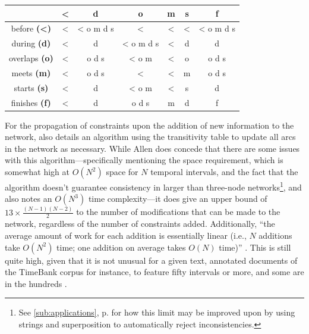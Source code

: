 \documentclass[a4paper,12pt,leqno,twoside]{article}
\makeatletter
\newcommand*\bigcdot{\mathpalette\bigcdot@{0.75}}
\newcommand*\bigcdot@[2]{\mathbin{\vcenter{\hbox{\scalebox{#2}{$\m@th#1\bullet$}}}}}
\makeatother
\begin{document}
\begin{center}
	\onehalfspacing
	\begin{tabular}{|c|c|c|c|c|c|c|}
		\hline
		\diagbox{$A \bigcdot B$}{$B \bigcdot' C$} & \textbf{\textless{}} & \textbf{d} & \textbf{o} & \textbf{m} & \textbf{s} & \textbf{f}\\
		\hline
		before \textbf{(\textless{})} & \textless{} & \textless{} o m d s & \textless{} & \textless{} & \textless{} & \textless{} o m d s\\
		\hline
		during \textbf{(d)} & \textless{} & d & \textless{} o m d s & \textless{} & d & d\\
		\hline
		overlaps \textbf{(o)} & \textless{} & o d s & \textless{} o m & \textless{} & o & o d s\\
		\hline
		meets \textbf{(m)} & \textless{} & o d s & \textless{} & \textless{} & m & o d s\\
		\hline
		starts \textbf{(s)} & \textless{} & d & \textless{} o m & \textless{} & s & d\\
		\hline
		finishes \textbf{(f)} & \textless{} & d & o d s & m & d & f\\
		\hline
	\end{tabular}
	\label{tab:allen-trans-table}
\end{center}
\label{other:allen-algo}For the propagation of constraints upon the addition of new information to the network, \citet[p. 835]{allen1983maintaining} also details an algorithm using the transitivity table to update all arcs in the network as necessary. While Allen does concede that there are some issues with this algorithm---specifically mentioning the space requirement, which is somewhat high at $O(N^2)$ space for $N$ temporal intervals, and the fact that the algorithm doesn't guarantee consistency in larger than three-node networks\footnote{See \cref{sub:applications}, p. \pageref{ex:str-inconsistency} for how this limit may be improved upon by using strings and superposition to automatically reject inconsistencies.}, and \citet[p. 219]{Verhagen2005} also notes an $O(N^3)$ time complexity---it does give an upper bound of $13 \times \frac{(N - 1)(N - 2)}{2}$ to the number of modifications that can be made to the network, regardless of the number of constraints added. Additionally, ``the average amount of work for each addition is essentially linear (i.e., $N$ additions take $O(N^2)$ time; one addition on average takes $O(N)$ time)'' \citep[p. 837]{allen1983maintaining}. This is still quite high, given that it is not unusual for a given text, annotated documents of the TimeBank \citep{pustejovsky2003timebank,pustejovsky2006timebank} corpus for instance, to feature fifty intervals or more, and some are in the hundreds \citep[p. 213]{Verhagen2005}.
\end{document}
